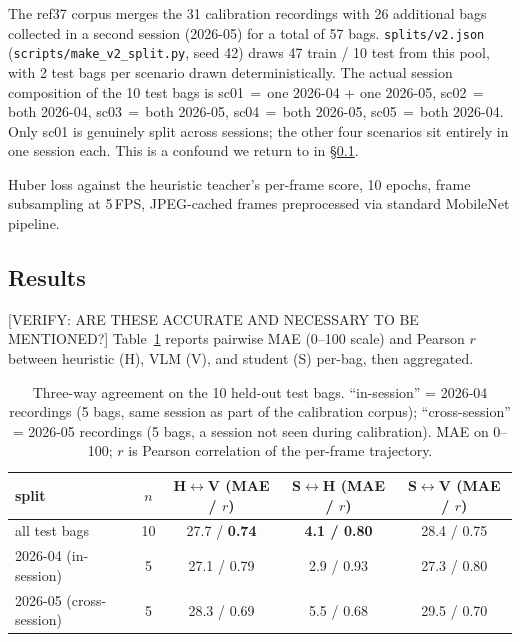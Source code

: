 \documentclass{article}
\newcommand{\code}[1]{\texttt{\small #1}}
\begin{document}
The ref37 corpus merges the 31 calibration recordings with 26 additional bags collected in a second session (2026-05) for a total of 57 bags. \code{splits/v2.json} (\code{scripts/make\_v2\_split.py}, seed 42) draws 47 train / 10 test from this pool, with 2 test bags per scenario drawn deterministically. The actual session composition of the 10 test bags is sc01\,$=$\,one 2026-04 + one 2026-05, sc02\,$=$\,both 2026-04, sc03\,$=$\,both 2026-05, sc04\,$=$\,both 2026-05, sc05\,$=$\,both 2026-04. Only sc01 is genuinely split across sessions; the other four scenarios sit entirely in one session each. This is a confound we return to in \S\ref{sec:distill-results}.

Huber loss against the heuristic teacher's per-frame score, 10 epochs, frame subsampling at 5\,FPS, JPEG-cached frames preprocessed via standard MobileNet pipeline.

\subsection{Results}\label{sec:distill-results}

[VERIFY: ARE THESE ACCURATE AND NECESSARY TO BE MENTIONED?] Table~\ref{tab:distill} reports pairwise MAE (0--100 scale) and Pearson $r$ between heuristic (H), VLM (V), and student (S) per-bag, then aggregated.

\begin{table}[h]
\centering
\caption{Three-way agreement on the 10 held-out test bags. ``in-session'' = 2026-04 recordings (5 bags, same session as part of the calibration corpus); ``cross-session'' = 2026-05 recordings (5 bags, a session not seen during calibration). MAE on 0--100; $r$ is Pearson correlation of the per-frame trajectory.}
\label{tab:distill}
\small
\begin{tabular}{@{}lcccc@{}}
\toprule
split & $n$ & H$\leftrightarrow$V (MAE / $r$) & S$\leftrightarrow$H (MAE / $r$) & S$\leftrightarrow$V (MAE / $r$) \\
\midrule
all test bags          & 10 & 27.7 / \textbf{0.74} & \textbf{4.1 / 0.80} & 28.4 / 0.75 \\
2026-04 (in-session)   & 5  & 27.1 / 0.79          & 2.9 / 0.93          & 27.3 / 0.80 \\
2026-05 (cross-session)& 5  & 28.3 / 0.69          & 5.5 / 0.68          & 29.5 / 0.70 \\
\bottomrule
\end{tabular}
\end{table}
\end{document}
